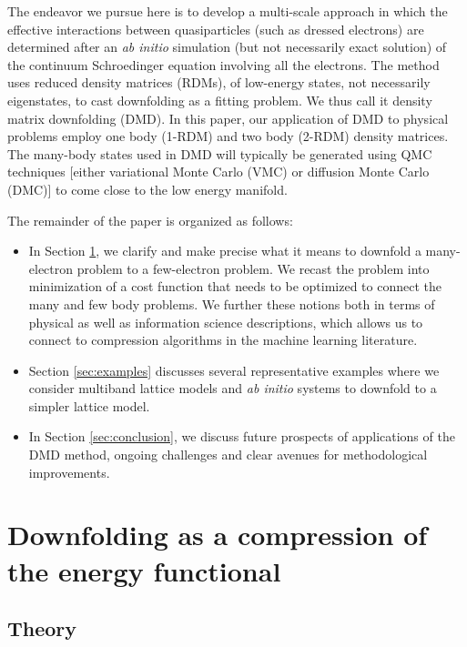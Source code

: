 \documentclass[aps, prb, 11pt]{revtex4-1}
\begin{document}
The endeavor we pursue here is to develop a multi-scale approach in which the effective interactions between quasiparticles (such as dressed electrons) are determined after an \textit{ab initio} simulation (but not necessarily exact solution) of the continuum Schroedinger equation involving all the electrons. 
The method uses reduced density matrices (RDMs), of low-energy states, not necessarily eigenstates, 
to cast downfolding as a fitting problem.  
We thus call it density matrix downfolding (DMD). 
In this paper, our application of DMD to physical problems employ one body (1-RDM) and two body (2-RDM) density matrices. 
The many-body states used in DMD will typically be generated using QMC techniques [either variational Monte Carlo (VMC) or diffusion Monte Carlo (DMC)] to come close to the low energy manifold.

The remainder of the paper is organized as follows:
\begin{itemize} 
\item In Section \ref{sec:theory}, we clarify and make precise what it means to downfold 
a many-electron problem to a few-electron problem. We recast the problem into minimization 
of a cost function that needs to be optimized to connect the many and few body problems. We further 
these notions both in terms of physical as well as information science descriptions, which allows us to connect to compression algorithms in the machine learning literature. 
\item Section \ref{sec:examples} discusses several representative examples where we consider multiband lattice models 
and {\it ab initio} systems to downfold to a simpler lattice model. 
\item In Section \ref{sec:conclusion}, we discuss future prospects of applications of the DMD method, ongoing challenges 
and clear avenues for methodological improvements. 
\end{itemize}


\newtheorem{theorem}{Theorem}
\newtheorem{definition}{Definition}
\newtheorem{lemma}{Lemma}


\section{Downfolding as a compression of the energy functional}
\label{sec:theory}
\subsection{Theory} 
\end{document}
